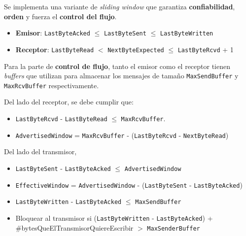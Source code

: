 \documentclass[]{article}
\begin{document}


Se implementa una variante de \emph{sliding window} que garantiza \textbf{confiabilidad}, \textbf{orden} y fuerza el \textbf{control del flujo}.

\begin{itemize}
    \item \textbf{Emisor}: \texttt{LastByteAcked} $\leq$ \texttt{LastByteSent} $\leq$ \texttt{LastByteWritten}
    \item \textbf{Receptor}: \texttt{LastByteRead} $ < $ \texttt{NextByteExpected} $\leq$ \texttt{LastByteRcvd} + 1
\end{itemize}


Para la parte de \textbf{control de flujo}, tanto el emisor como el receptor tienen \emph{buffers} que utilizan para almacenar los mensajes de tamaño \texttt{MaxSendBuffer} y \texttt{MaxRcvBuffer} respectivamente.

Del lado del receptor, se debe cumplir que:
\begin{itemize}
    \item \texttt{LastByteRcvd} - \texttt{LastByteRead} $\leq$ \texttt{MaxRcvBuffer}.
    \item \texttt{AdvertisedWindow} = \texttt{MaxRcvBuffer} - (\texttt{LastByteRcvd} - \texttt{NextByteRead})
\end{itemize}

Del lado del transmisor,
\begin{itemize}
    \item \texttt{LastByteSent} - \texttt{LastByteAcked} $\leq$ \texttt{AdvertisedWindow}
    \item \texttt{EffectiveWindow} = \texttt{AdvertisedWindow} - (\texttt{LastByteSent} - \texttt{LastByteAcked})
    \item \texttt{LastByteWritten} - \texttt{LastByteAcked} $\leq$ \texttt{MaxSendBuffer}
    \item Bloquear al transmisor si (\texttt{LastByteWritten} - \texttt{LastByteAcked}) + \#bytesQueElTransmisorQuiereEscribir $>$ \texttt{MaxSenderBuffer}
\end{itemize}

\end{document}
